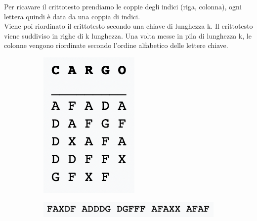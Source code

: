 \documentclass[11pt, oneside]{article}   	%
\begin{document}
Per ricavare il crittotesto prendiamo le coppie degli indici (riga, colonna), ogni lettera quindi è data da una coppia di indici. \\Viene poi riordinato il crittotesto secondo una chiave di lunghezza k. Il crittotesto viene suddiviso in righe di k lunghezza. Una volta messe in pila di lunghezza k, le colonne vengono riordinate secondo l'ordine alfabetico delle lettere chiave.
\begin{figure}[H]
\begin{subfigure}[h]{0.2\linewidth}
\includegraphics[width=\linewidth]{pre}
\end{subfigure}
\hfill
\begin{subfigure}[h]{0.5\linewidth}
\includegraphics[width=\linewidth]{adfgx2}

\end{subfigure}
\end{figure}
\end{document}
